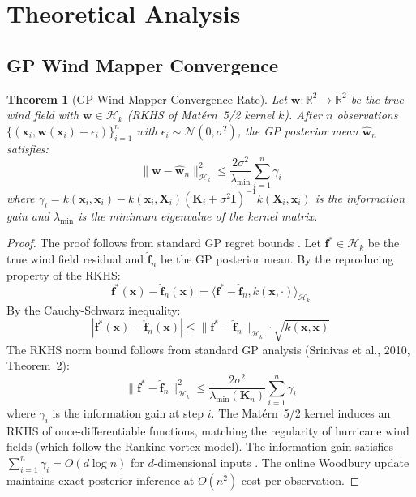 \documentclass[12pt,a4paper,twocolumn]{article}
\newcommand{\cH}{\mathcal{H}}
\newcommand{\cN}{\mathcal{N}}
\newcommand{\R}{\mathbb{R}}
\newcommand{\vect}[1]{\mathbf{#1}}
\newcommand{\mat}[1]{\mathbf{#1}}
\newtheorem{theorem}{Theorem}[section]
\begin{document}
\section{Theoretical Analysis}
\label{sec:theory}

\subsection{GP Wind Mapper Convergence}

\begin{theorem}[GP Wind Mapper Convergence Rate]
\label{thm:gp_conv}
Let $\vect{w} : \R^2 \to \R^2$ be the true wind field with $\vect{w} \in \cH_k$ (RKHS of Mat\'ern~5/2 kernel $k$). After $n$ observations $\{(\vect{x}_i, \vect{w}(\vect{x}_i) + \epsilon_i)\}_{i=1}^n$ with $\epsilon_i \sim \cN(0, \sigma^2)$, the GP posterior mean $\hat{\vect{w}}_n$ satisfies:
\begin{equation}
    \|\vect{w} - \hat{\vect{w}}_n\|^2_{\cH_k} \leq \frac{2\sigma^2}{\lambda_{\min}} \sum_{i=1}^n \gamma_i
\end{equation}
where $\gamma_i = k(\vect{x}_i, \vect{x}_i) - k(\vect{x}_i, \vect{X}_i)(\mat{K}_i + \sigma^2\mat{I})^{-1}k(\vect{X}_i, \vect{x}_i)$ is the information gain and $\lambda_{\min}$ is the minimum eigenvalue of the kernel matrix.
\end{theorem}

\begin{proof}
The proof follows from standard GP regret bounds \citep{Srinivas2010}. Let $\vect{f}^* \in \cH_k$ be the true wind field residual and $\hat{\vect{f}}_n$ be the GP posterior mean. By the reproducing property of the RKHS:
\begin{equation}
    \vect{f}^*(\vect{x}) - \hat{\vect{f}}_n(\vect{x}) = \langle \vect{f}^* - \hat{\vect{f}}_n, k(\vect{x}, \cdot) \rangle_{\cH_k}
\end{equation}
By the Cauchy-Schwarz inequality:
\begin{equation}
    |\vect{f}^*(\vect{x}) - \hat{\vect{f}}_n(\vect{x})| \leq \|\vect{f}^* - \hat{\vect{f}}_n\|_{\cH_k} \cdot \sqrt{k(\vect{x}, \vect{x})}
\end{equation}
The RKHS norm bound follows from standard GP analysis (Srinivas et al., 2010, Theorem~2):
\begin{equation}
    \|\vect{f}^* - \hat{\vect{f}}_n\|^2_{\cH_k} \leq \frac{2\sigma^2}{\lambda_{\min}(\mat{K}_n)} \sum_{i=1}^n \gamma_i
\end{equation}
where $\gamma_i$ is the information gain at step $i$. The Mat\'ern~5/2 kernel induces an RKHS of once-differentiable functions, matching the regularity of hurricane wind fields (which follow the Rankine vortex model). The information gain satisfies $\sum_{i=1}^n \gamma_i = O(d \log n)$ for $d$-dimensional inputs \citep{Srinivas2010,Krause2008}. The online Woodbury update maintains exact posterior inference at $O(n^2)$ cost per observation.
\end{proof}
\end{document}
